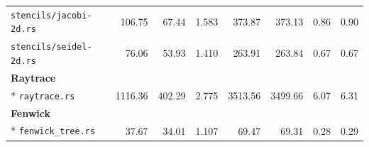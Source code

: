 \begin{longtable}{p{48mm}rrrrrrr}
\nolinkurl{stencils/jacobi-2d.rs} & 106.75 & 67.44 & 1.583 & 373.87 & 373.13 & 0.86 & 0.90 \\
\nolinkurl{stencils/seidel-2d.rs} & 76.06 & 53.93 & 1.410 & 263.91 & 263.84 & 0.67 & 0.67 \\
\multicolumn{8}{l}{\textbf{Raytrace}}\\*
\nolinkurl{raytrace.rs} & 1116.36 & 402.29 & 2.775 & 3513.56 & 3499.66 & 6.07 & 6.31 \\
\multicolumn{8}{l}{\textbf{Fenwick}}\\*
\nolinkurl{fenwick_tree.rs} & 37.67 & 34.01 & 1.107 & 69.47 & 69.31 & 0.28 & 0.29 \\
\end{longtable}\endgroup
